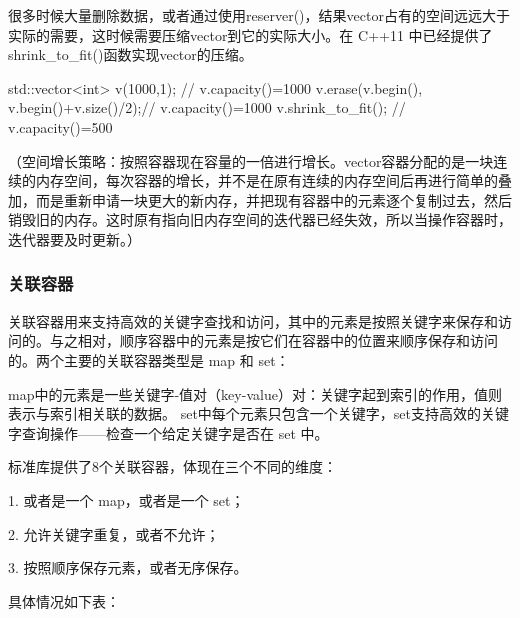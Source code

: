 很多时候大量删除数据，或者通过使用reserver()，结果vector占有的空间远远大于实际的需要，这时候需要压缩vector到它的实际大小。在 C++11 中已经提供了shrink_to_fit()函数实现vector的压缩。
\begin{Code}
std::vector<int> v(1000,1);              // v.capacity()=1000
v.erase(v.begin(), v.begin()+v.size()/2);// v.capacity()=1000
v.shrink_to_fit();                       // v.capacity()=500
\end{Code}
（空间增长策略：按照容器现在容量的一倍进行增长。vector容器分配的是一块连续的内存空间，每次容器的增长，并不是在原有连续的内存空间后再进行简单的叠加，而是重新申请一块更大的新内存，并把现有容器中的元素逐个复制过去，然后销毁旧的内存。这时原有指向旧内存空间的迭代器已经失效，所以当操作容器时，迭代器要及时更新。）

\subsubsection {关联容器}

关联容器用来支持高效的关键字查找和访问，其中的元素是按照关键字来保存和访问的。与之相对，顺序容器中的元素是按它们在容器中的位置来顺序保存和访问的。两个主要的关联容器类型是 map 和 set：

 map中的元素是一些关键字-值对（key-value）对：关键字起到索引的作用，值则表示与索引相关联的数据。
 set中每个元素只包含一个关键字，set支持高效的关键字查询操作——检查一个给定关键字是否在 set 中。

标准库提供了8个关联容器，体现在三个不同的维度：

1. 或者是一个 map，或者是一个 set；

2. 允许关键字重复，或者不允许；

3. 按照顺序保存元素，或者无序保存。

具体情况如下表：

